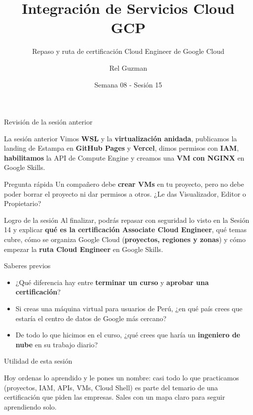 \documentclass[aspectratio=169,10pt,c]{beamer}
\title{Integración de Servicios Cloud GCP}
\subtitle{Repaso y ruta de certificación Cloud Engineer de Google Cloud}
\date{Semana 08 - Sesión 15}
\author{Rel Guzman}
\begin{document}
{\maketitle}

\begin{frame}[c]{Revisión de la sesión anterior}
\begin{block}{La sesión anterior}
\small Vimos \textbf{WSL} y la \textbf{virtualización anidada}, publicamos la landing de Estampa en \textbf{GitHub Pages} y \textbf{Vercel}, dimos permisos con \textbf{IAM}, \textbf{habilitamos} la API de Compute Engine y creamos una \textbf{VM con NGINX} en Google Skills.
\end{block}
\begin{alertblock}{Pregunta rápida}
\small Un compañero debe \textbf{crear VMs} en tu proyecto, pero no debe poder borrar el proyecto ni dar permisos a otros. ¿Le das Visualizador, Editor o Propietario?
\end{alertblock}
\end{frame}

\begin{frame}[c]
\begin{block}{Logro de la sesión}
Al finalizar, podrás repasar con seguridad lo visto en la Sesión 14 y explicar \textbf{qué es la certificación Associate Cloud Engineer}, qué temas cubre, cómo se organiza Google Cloud (\textbf{proyectos, regiones y zonas}) y cómo empezar la \textbf{ruta Cloud Engineer} en Google Skills.
\end{block}
\end{frame}

\begin{frame}{Saberes previos}
\begin{itemize}\setlength\itemsep{10pt}
  \item ¿Qué diferencia hay entre \textbf{terminar un curso} y \textbf{aprobar una certificación}?
  \item Si creas una máquina virtual para usuarios de Perú, ¿en qué país crees que estaría el centro de datos de Google más cercano?
  \item De todo lo que hicimos en el curso, ¿qué crees que haría un \textbf{ingeniero de nube} en su trabajo diario?
\end{itemize}
\end{frame}

\begin{frame}[c]{Utilidad de esta sesión}
\begin{center}
\begin{minipage}{.86\textwidth}
{\large Hoy ordenas lo aprendido y le pones un nombre: casi todo lo que practicamos (proyectos, IAM, APIs, VMs, Cloud Shell) es parte del temario de una certificación que piden las empresas. Sales con un mapa claro para seguir aprendiendo solo.}
\end{minipage}
\end{center}
\end{frame}
\end{document}
